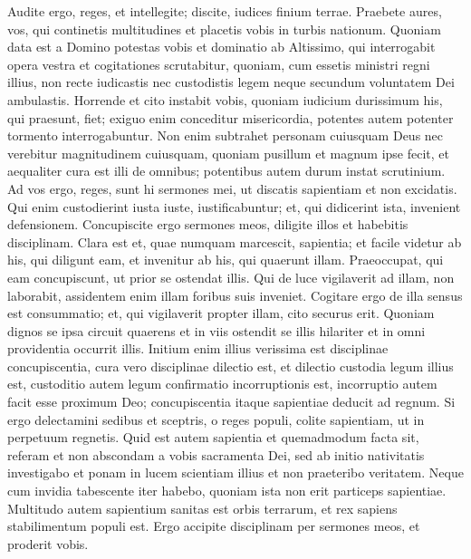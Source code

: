 \begin{biblechapter}
\begin{biblechapter}
\begin{biblechapter}
\begin{biblechapter}
\begin{biblechapter}
\begin{biblechapter}
\verse Audite ergo, reges, et intellegite;
 discite, iudices finium terrae.
 \verse Praebete aures, vos, qui continetis multitudines
 et placetis vobis in turbis nationum.
 \verse Quoniam data est a Domino potestas vobis
 et dominatio ab Altissimo,
 qui interrogabit opera vestra
 et cogitationes scrutabitur,
 \verse quoniam, cum essetis ministri regni illius,
 non recte iudicastis
 nec custodistis legem
 neque secundum voluntatem Dei ambulastis.
 \verse Horrende et cito instabit vobis,
 quoniam iudicium durissimum his, qui praesunt, fiet;
 \verse exiguo enim conceditur misericordia,
 potentes autem potenter tormento interrogabuntur.
 \verse Non enim subtrahet personam cuiusquam Deus
 nec verebitur magnitudinem cuiusquam,
 quoniam pusillum et magnum ipse fecit,
 et aequaliter cura est illi de omnibus;
 \verse potentibus autem durum instat scrutinium.
 \verse Ad vos ergo, reges, sunt hi sermones mei,
 ut discatis sapientiam et non excidatis.
 \verse Qui enim custodierint iusta iuste, iustificabuntur;
 et, qui didicerint ista, invenient defensionem.
 \verse Concupiscite ergo sermones meos,
 diligite illos et habebitis disciplinam.
 \verse Clara est et, quae numquam marcescit, sapientia;
 et facile videtur ab his, qui diligunt eam,
 et invenitur ab his, qui quaerunt illam.
 \verse Praeoccupat, qui eam concupiscunt,
 ut prior se ostendat illis.
 \verse Qui de luce vigilaverit ad illam, non laborabit,
 assidentem enim illam foribus suis inveniet.
 \verse Cogitare ergo de illa sensus est consummatio;
 et, qui vigilaverit propter illam, cito securus erit.
 \verse Quoniam dignos se ipsa circuit quaerens
 et in viis ostendit se illis hilariter
 et in omni providentia occurrit illis.
 \verse Initium enim illius verissima est disciplinae concupiscentia,
 cura vero disciplinae dilectio est,
 \verse et dilectio custodia legum illius est,
 custoditio autem legum confirmatio incorruptionis est,
 \verse incorruptio autem facit esse proximum Deo;
 \verse concupiscentia itaque sapientiae deducit ad regnum.
 \verse Si ergo delectamini sedibus et sceptris, o reges populi,
 colite sapientiam, ut in perpetuum regnetis.
 \verse Quid est autem sapientia et quemadmodum facta sit, referam
 et non abscondam a vobis sacramenta Dei,
 sed ab initio nativitatis investigabo
 et ponam in lucem scientiam illius
 et non praeteribo veritatem.
 \verse Neque cum invidia tabescente iter habebo,
 quoniam ista non erit particeps sapientiae.
 \verse Multitudo autem sapientium sanitas est orbis terrarum,
 et rex sapiens stabilimentum populi est.
 \verse Ergo accipite disciplinam per sermones meos,
 et proderit vobis.
 

\end{biblechapter}
\end{biblechapter}
\end{biblechapter}
\end{biblechapter}
\end{biblechapter}
\end{biblechapter}
